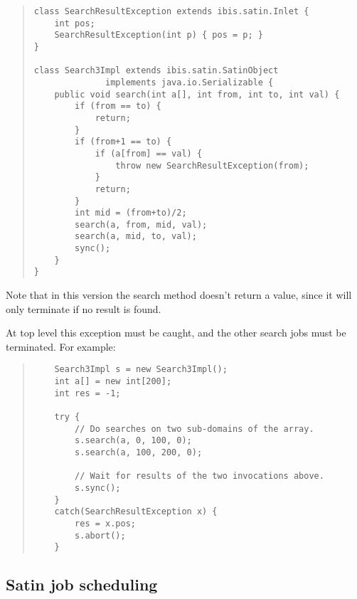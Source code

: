 \documentclass[10pt]{article}
\newcommand{\mysubsection}[1]{\subsection{#1}\label{#1}}
\begin{document}
\begin{quote}
\begin{verbatim}
class SearchResultException extends ibis.satin.Inlet {
    int pos;
    SearchResultException(int p) { pos = p; }
}

class Search3Impl extends ibis.satin.SatinObject
              implements java.io.Serializable {
    public void search(int a[], int from, int to, int val) {
        if (from == to) {
            return;
        }
        if (from+1 == to) {
            if (a[from] == val) {
                throw new SearchResultException(from);
            }
            return;
        }
        int mid = (from+to)/2;
        search(a, from, mid, val);
        search(a, mid, to, val);
        sync();
    }
}
\end{verbatim}
\end{quote}

Note that in this version the search method doesn't return a value,
since it will only terminate if no result is found.

At top level this exception must be caught, and the other search
jobs must be terminated. For example:

\begin{quote}
\begin{verbatim}
    Search3Impl s = new Search3Impl();
    int a[] = new int[200];
    int res = -1;

    try {
        // Do searches on two sub-domains of the array.
        s.search(a, 0, 100, 0);
        s.search(a, 100, 200, 0);

        // Wait for results of the two invocations above.
        s.sync();
    }
    catch(SearchResultException x) {
        res = x.pos;
        s.abort();
    }
\end{verbatim}
\end{quote}

\mysubsection{Satin job scheduling}
\end{document}
